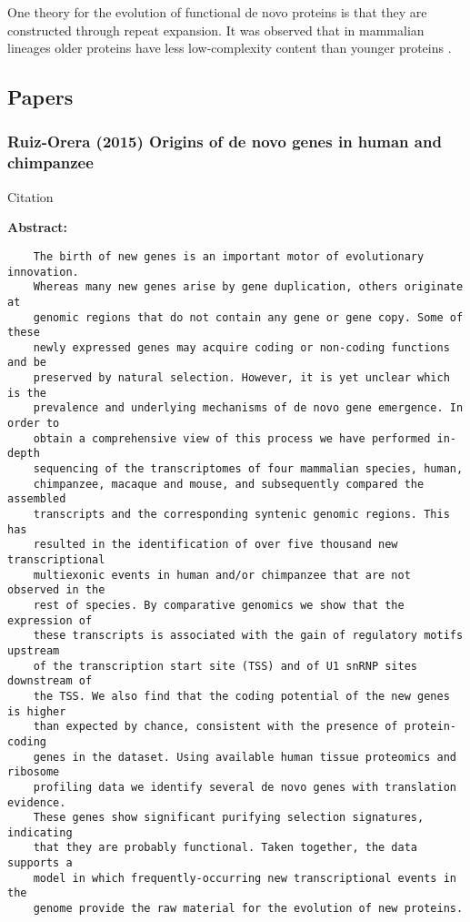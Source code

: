 One theory for the evolution of functional de novo proteins is that they are
constructed through repeat expansion. It was observed that in mammalian
lineages older proteins have less low-complexity content than younger proteins
\cite{toll2011complexity}.

\subsection{Papers}

\subsubsection{Ruiz-Orera (2015) Origins of de novo genes in human and chimpanzee}

    Citation \cite{ruiz-orera_origins_2015}

    \textbf{Abstract:}

    \begin{verbatim}
    The birth of new genes is an important motor of evolutionary innovation.
    Whereas many new genes arise by gene duplication, others originate at
    genomic regions that do not contain any gene or gene copy. Some of these
    newly expressed genes may acquire coding or non-coding functions and be
    preserved by natural selection. However, it is yet unclear which is the
    prevalence and underlying mechanisms of de novo gene emergence. In order to
    obtain a comprehensive view of this process we have performed in-depth
    sequencing of the transcriptomes of four mammalian species, human,
    chimpanzee, macaque and mouse, and subsequently compared the assembled
    transcripts and the corresponding syntenic genomic regions. This has
    resulted in the identification of over five thousand new transcriptional
    multiexonic events in human and/or chimpanzee that are not observed in the
    rest of species. By comparative genomics we show that the expression of
    these transcripts is associated with the gain of regulatory motifs upstream
    of the transcription start site (TSS) and of U1 snRNP sites downstream of
    the TSS. We also find that the coding potential of the new genes is higher
    than expected by chance, consistent with the presence of protein-coding
    genes in the dataset. Using available human tissue proteomics and ribosome
    profiling data we identify several de novo genes with translation evidence.
    These genes show significant purifying selection signatures, indicating
    that they are probably functional. Taken together, the data supports a
    model in which frequently-occurring new transcriptional events in the
    genome provide the raw material for the evolution of new proteins.
    \end{verbatim}

